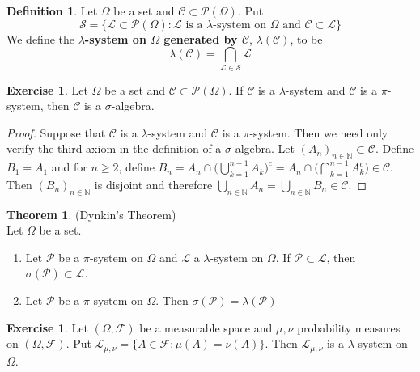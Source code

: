 \documentclass[12pt]{amsart}
\theoremstyle{definition}
\newtheorem{defn}[definition]{Definition}
\newtheorem{thm}[definition]{Theorem}
\newtheorem{ex}[definition]{Exercise}
\newcommand{\lam}{\lambda}
\newcommand{\sig}{\sigma}
\newcommand{\Om}{\Omega}
\newcommand{\N}{\mathbb{N}}
\newcommand{\MC}{\mathcal{C}}
\newcommand{\MF}{\mathcal{F}}
\newcommand{\ML}{\mathcal{L}}
\newcommand{\MS}{\mathcal{S}}
\newcommand{\MP}{\mathcal{P}}
\begin{document}
	\begin{defn}
		Let $\Om$ be a set and $\MC \subset \MP(\Om)$. Put $$\MS = \{\ML \subset \MP(\Om): \ML \text{ is a }\lam\text{-system on }\Om \text{ and } \MC \subset \ML\}$$ We define the \textbf{$\lam$-system on $\Om$ generated by $\MC$}, $\lam(\MC)$, to be $$\lam(\MC) = \bigcap_{\ML \in \MS}\ML$$
	\end{defn}
	
	\begin{ex}
		Let $\Om$ be a set and $\MC \subset \MP(\Om)$. If $\MC$ is a $\lam$-system and $\MC$ is a $\pi$-system, then $\MC$ is a $\sig$-algebra.
	\end{ex}
	
	\begin{proof}
		Suppose that $\MC$ is a $\lam$-system and $\MC$ is a $\pi$-system. Then we need only verify the third axiom in the definition of a $\sig$-algebra. Let $(A_n)_{n \in \N} \subset \MC$. Define $B_1 = A_1$ and for $n \geq 2$, define $B_n = A_n \cap \bigg( \bigcup\limits_{k=1}^{n-1}A_k \bigg)^c = A_n \cap \bigg( \bigcap\limits_{k=1}^{n-1}A_k^c \bigg) \in \MC$. Then $(B_n)_{n \in \N}$ is disjoint and therefore $\bigcup\limits_{n \in \N}A_n = \bigcup\limits_{n \in \N}B_n \in \MC$.
	\end{proof}
	
	\begin{thm}(Dynkin's Theorem) \\
		Let $\Om$ be a set.
		\begin{enumerate}
			\item Let $\MP$ be a $\pi$-system on $\Om$ and $\ML$ a $\lam$-system on $\Om$. If $\MP \subset \ML$, then $\sig(\MP) \subset \ML$.
			\item Let $\MP$ be a $\pi$-system on $\Om$. Then $\sig(\MP) = \lam(\MP)$
		\end{enumerate} 
		
	\end{thm}
	
	\begin{ex}
		Let $(\Om, \MF)$ be a measurable space and $\mu, \nu$ probability measures on $(\Om, \MF)$. Put $\ML_{\mu,\nu} = \{A \in \MF: \mu(A) = \nu(A)\}$. Then $\ML_{\mu, \nu}$ is a $\lam$-system on $\Om$.
	\end{ex}
	
\end{document}
